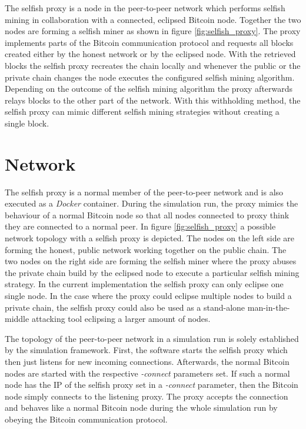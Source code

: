 The selfish proxy is a node in the peer-to-peer network which performs selfish mining in collaboration with a connected, eclipsed Bitcoin node.
Together the two nodes are forming a selfish miner as shown in figure \ref{fig:selfish_proxy}.
The proxy implements parts of the Bitcoin communication protocol and requests all blocks created either by the honest network or by the eclipsed node.
With the retrieved blocks the selfish proxy recreates the chain locally and whenever the public or the private chain changes the node executes the configured selfish mining algorithm.
Depending on the outcome of the selfish mining algorithm the proxy afterwards relays blocks to the other part of the network.
With this withholding method, the selfish proxy can mimic different selfish mining strategies without creating a single block.

\section{Network}

The selfish proxy is a normal member of the peer-to-peer network and is also executed as a \textit{Docker} container.
During the simulation run, the proxy mimics the behaviour of a normal Bitcoin node so that all nodes connected to proxy think they are connected to a normal peer.
In figure \ref{fig:selfish_proxy} a possible network topology with a selfish proxy is depicted.
The nodes on the left side are forming the honest, public network working together on the public chain.
The two nodes on the right side are forming the selfish miner where the proxy abuses the private chain build by the eclipsed node to execute a particular selfish mining strategy.
In the current implementation the selfish proxy can only eclipse one single node.
In the case where the proxy could eclipse multiple nodes to build a private chain, the selfish proxy could also be used as a stand-alone man-in-the-middle attacking tool eclipsing a larger amount of nodes.

The topology of the peer-to-peer network in a simulation run is solely established by the simulation framework.
First, the software starts the selfish proxy which then just listens for new incoming connections.
Afterwards, the normal Bitcoin nodes are started with the respective \textit{-connect} parameters set.
If such a normal node has the IP of the selfish proxy set in a \textit{-connect} parameter, then the Bitcoin node simply connects to the listening proxy.
The proxy accepts the connection and behaves like a normal Bitcoin node during the whole simulation run by obeying the Bitcoin communication protocol.

